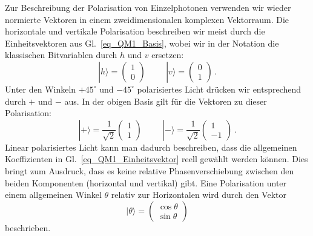Zur Beschreibung der Polarisation von Einzelphotonen verwenden wir wieder normierte Vektoren
in einem zweidimensionalen komplexen Vektorraum. Die horizontale und vertikale Polarisation beschreiben
wir meist durch die Einheitsvektoren aus Gl.\ \ref{eq_QM1_Basis}, wobei wir in der Notation die klassischen
Bitvariablen durch $h$ und $v$ ersetzen:
\begin{equation}
           |h\rangle = \left(\!\! \begin{array}{c}  1 \\ 0 \end{array}\!\! \right)  \hspace{1cm}
           |v\rangle = \left(\!\! \begin{array}{c}  0 \\ 1 \end{array} \!\!\right)  \, . 
\end{equation} 
Unter den Winkeln $+45^\circ$ und $-45^\circ$ polarisiertes Licht dr\"ucken wir entsprechend durch
$+$ und $-$ aus. In der obigen Basis gilt f\"ur die Vektoren zu dieser Polarisation:
\begin{equation}
           |+\rangle = \frac{1}{\sqrt{2}} \left(\!\! \begin{array}{c}  1 \\ 1 \end{array}\!\! \right)  \hspace{1cm}
           |-\rangle = \frac{1}{\sqrt{2}} \left(\!\! \begin{array}{c}  1  \\ - 1 \end{array}\!\! \right)  \, . 
\end{equation} 
Linear polarisiertes Licht kann man dadurch beschreiben, dass die allgemeinen Koeffizienten
in Gl.\ \ref{eq_QM1_Einheitsvektor} reell gew\"ahlt werden k\"onnen. Dies bringt zum Ausdruck, dass es
keine relative Phasenverschiebung zwischen den beiden Komponenten (horizontal und vertikal) gibt. 
Eine Polarisation unter einem allgemeinen Winkel $\theta$ relativ zur Horizontalen wird durch den
Vektor
\begin{equation}
           |\theta \rangle =  \left( \!\!\begin{array}{c}  \cos \theta \\ \sin \theta \end{array} \!\!\right)    
\end{equation} 
beschrieben.

